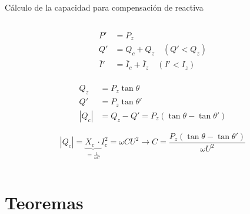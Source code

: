 \documentclass[aspectratio=169, usenames,svgnames,dvipsnames]{beamer}
\begin{document}
\begin{frame}{Cálculo de la capacidad para compensación de reactiva}
\begin{columns}
\begin{column}{0.6\linewidth}
        \vspace{-1mm}
        \begin{align*}
          P' &= P_z\\
          Q' &= Q_c + Q_z \quad (Q' < Q_z)\\
          \overline{I}' &= \overline{I}_c + \overline{I}_z \quad (I' < I_z)\\
        \end{align*}

        \vspace{-10mm}
        \begin{align*}
            Q_z &= P_z \tan \theta\\
            Q'&= P_z \tan \theta'\\
            |Q_c| &= Q_z - Q' = P_z (\tan \theta - \tan \theta')
        \end{align*}

        \vspace{-9mm}
        \[
            |Q_c| = \underbrace{X_c \,\cdot}_{=\frac{1}{\omega C}} I_c^2 = \omega C U^2 \rightarrow \boxed{C = \frac{P_z (\tan \theta - \tan \theta')}{\omega U^2}}
        \]
    \end{column}
    \end{columns}
\end{frame}


\section{Teoremas}
\end{document}
